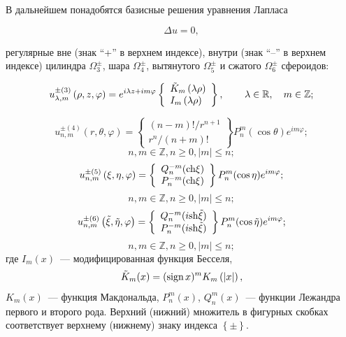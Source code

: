 В дальнейшем понадобятся базисные решения уравнения Лапласа

\begin{equation}
\Delta u = 0,
\end{equation}

\noindent регулярные вне (знак ``+'' в верхнем индексе), внутри (знак ``--'' в верхнем индексе) цилиндра $\Omega _3^ \pm$, шара $\Omega _4^ \pm$, вытянутого $\Omega _5^ \pm $ и сжатого $\Omega _6^ \pm $ сфероидов:

\begin{equation}\label{eq:1:4}
u_{\lambda ,m}^{ \pm (3)}\left( {\rho ,z,\varphi } \right) = {e^{i\lambda z + im\varphi }}\left\{ \begin{array}{l}
{{\tilde K}_m}\left( {\lambda \rho } \right)\\
{I_m}\left( {\lambda \rho } \right)
\end{array} \right\},\qquad {\kern 1pt} \lambda  \in \mathbb{R},\quad m \in \mathbb{Z};
\end{equation}

\begin{equation}\label{eq:1:5}
u_{n,m}^{ \pm (4)}\left( {r,\theta ,\varphi } \right) = \left\{ \begin{array}{l}
(n - m)!/{r^{n + 1}}\\
{r^n}/(n + m)!
\end{array} \right\}P_n^m(\cos \theta ){e^{im\varphi }};
\end{equation}
$$
n,m \in \mathbb{Z}, n\ge 0, |m| \le n;
$$
\begin{equation}\label{eq:1:6}
u_{n,m}^{ \pm (5)}\left( {\xi ,\eta ,\varphi } \right) = \left\{ \begin{array}{l}
Q_n^{ - m}({\mathop{\rm ch}\nolimits} \xi )\\
P_n^{ - m}({\mathop{\rm ch}\nolimits} \xi )
\end{array} \right\}P_n^m(\cos \eta ){e^{im\varphi }};
\end{equation}
$$
n,m \in \mathbb{Z}, n\ge 0, |m| \le n;
$$
\begin{equation}\label{eq:1:7}
u_{n,m}^{ \pm (6)}\left( {\tilde \xi ,\tilde \eta ,\varphi } \right) = \left\{ \begin{array}{l}
Q_n^{ - m}(i{\mathop{\rm sh}\nolimits} \tilde \xi )\\
P_n^{ - m}(i{\mathop{\rm sh}\nolimits} \tilde \xi )
\end{array} \right\}P_n^m(\cos \tilde \eta ){e^{im\varphi }};
\end{equation}
$$
n,m \in \mathbb{Z}, n\ge 0, |m| \le n;
$$
\noindent где ${I_m}(x)$~--- модифицированная функция Бесселя, $${\tilde K_m}(x) = {({\rm{sign}}{\mkern 1mu} {\kern 1pt} x)^m}{K_m}\left( {|x|} \right),$$
${K_m}(x)$~--- функция Макдональда, $P_n^m(x)$, $Q_n^m(x)$~--- функции Лежандра первого и второго рода. Верхний (нижний) множитель в фигурных скобках соответствует верхнему (нижнему) знаку индекса $\left\{  \pm  \right\}$.

